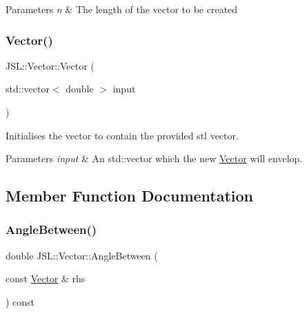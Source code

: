 \begin{DoxyParams}{Parameters}
{\em n} & The length of the vector to be created \\
\hline
\end{DoxyParams}
\mbox{\label{classJSL_1_1Vector_af5be93b29e1c2aab2882827d5001a2aa}} 
\subsubsection{\texorpdfstring{Vector()}{Vector()}\hspace{0.1cm}{\footnotesize\ttfamily [3/3]}}
{\footnotesize\ttfamily J\+S\+L\+::\+Vector\+::\+Vector (\begin{DoxyParamCaption}\item[{std\+::vector$<$ double $>$}]{input }\end{DoxyParamCaption})\hspace{0.3cm}{\ttfamily [inline]}}



Initialises the vector to contain the provided stl vector. 


\begin{DoxyParams}{Parameters}
{\em input} & An std\+::vector which the new \hyperlink{classJSL_1_1Vector}{Vector} will envelop. \\
\hline
\end{DoxyParams}


\subsection{Member Function Documentation}
\mbox{\label{classJSL_1_1Vector_a0529640bc02ce994026184d93f43f9c3}} 
\subsubsection{\texorpdfstring{Angle\+Between()}{AngleBetween()}}
{\footnotesize\ttfamily double J\+S\+L\+::\+Vector\+::\+Angle\+Between (\begin{DoxyParamCaption}\item[{const \hyperlink{classJSL_1_1Vector}{Vector} \&}]{rhs }\end{DoxyParamCaption}) const\hspace{0.3cm}{\ttfamily [inline]}}



